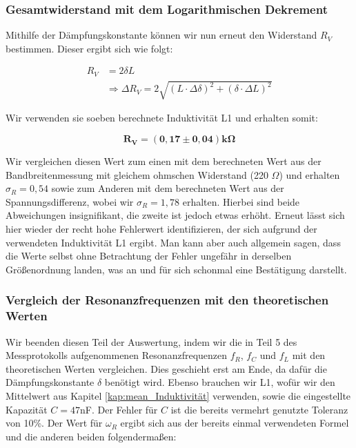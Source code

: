 \documentclass{article}
\begin{document}
\clearpage
\newpage

\subsubsection{Gesamtwiderstand mit dem Logarithmischen Dekrement}

Mithilfe der Dämpfungskonstante können wir nun erneut den Widerstand $R_V$ bestimmen. Dieser ergibt sich wie folgt:

\begin{equation}
    \begin{split}
        R_V &= 2 \delta L \\
        &\Rightarrow \Delta R_V = 2 \sqrt{(L \cdot \Delta \delta)^2 + (\delta \cdot \Delta L)^2}
    \end{split}
\end{equation}

Wir verwenden sie soeben berechnete Induktivität L1 und erhalten somit:

\begin{equation}
    \bm{R_V = (0,17 \pm 0,04) k\Omega} 
\end{equation}

Wir vergleichen diesen Wert zum einen mit dem berechneten Wert aus der Bandbreitenmessung mit gleichem ohmschen Widerstand (220 $\Omega$) und erhalten $\sigma_R = 0,54$ sowie zum Anderen mit dem berechneten Wert aus der Spannungsdifferenz, wobei wir $\sigma_R = 1,78$ erhalten. Hierbei sind beide Abweichungen insignifikant, die zweite ist jedoch etwas erhöht. Erneut lässt sich hier wieder der recht hohe Fehlerwert identifizieren, der sich aufgrund der verwendeten Induktivität L1 ergibt. Man kann aber auch allgemein sagen, dass die Werte selbst ohne Betrachtung der Fehler ungefähr in derselben Größenordnung landen, was an und für sich schonmal eine Bestätigung darstellt.

\subsubsection{Vergleich der Resonanzfrequenzen mit den theoretischen Werten}

Wir beenden diesen Teil der Auswertung, indem wir die in Teil 5 des Messprotokolls aufgenommenen Resonanzfrequenzen $f_R$, $f_C$ und $f_L$ mit den theoretischen Werten vergleichen. Dies geschieht erst am Ende, da dafür die Dämpfungskonstante $\delta$ benötigt wird. Ebenso brauchen wir L1, wofür wir den Mittelwert aus Kapitel \ref{kap:mean_Induktivität} verwenden, sowie die eingestellte Kapazität $C = 47$nF. Der Fehler für $C$ ist die bereits vermehrt genutzte Toleranz von 10\%. Der Wert für $\omega_R$ ergibt sich aus der bereits einmal verwendeten Formel und die anderen beiden folgendermaßen:
\end{document}
